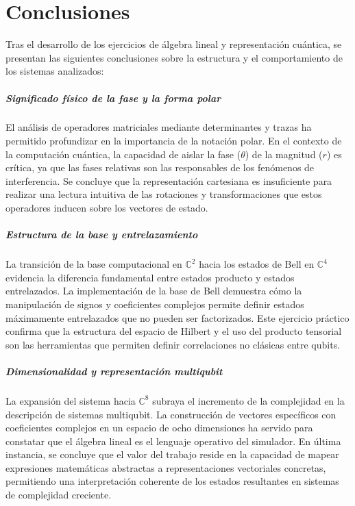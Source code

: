 \documentclass[11pt,a4paper,spanish]{book}
\begin{document}
\chapter{Conclusiones}

Tras el desarrollo de los ejercicios de álgebra lineal y representación cuántica, se presentan las siguientes conclusiones sobre la estructura y el comportamiento de los sistemas analizados:

\paragraph{Significado físico de la fase y la forma polar}
El análisis de operadores matriciales mediante determinantes y trazas ha permitido profundizar en la importancia de la notación polar. En el contexto de la computación cuántica, la capacidad de aislar la fase ($\theta$) de la magnitud ($r$) es crítica, ya que las fases relativas son las responsables de los fenómenos de interferencia. Se concluye que la representación cartesiana es insuficiente para realizar una lectura intuitiva de las rotaciones y transformaciones que estos operadores inducen sobre los vectores de estado.

\paragraph{Estructura de la base y entrelazamiento}
La transición de la base computacional en $\mathbb{C}^2$ hacia los estados de Bell en $\mathbb{C}^4$ evidencia la diferencia fundamental entre estados producto y estados entrelazados. La implementación de la base de Bell demuestra cómo la manipulación de signos y coeficientes complejos permite definir estados máximamente entrelazados que no pueden ser factorizados. Este ejercicio práctico confirma que la estructura del espacio de Hilbert y el uso del producto tensorial son las herramientas que permiten definir correlaciones no clásicas entre qubits.

\paragraph{Dimensionalidad y representación multiqubit}
La expansión del sistema hacia $\mathbb{C}^8$ subraya el incremento de la complejidad en la descripción de sistemas multiqubit. La construcción de vectores específicos con coeficientes complejos en un espacio de ocho dimensiones ha servido para constatar que el álgebra lineal es el lenguaje operativo del simulador. En última instancia, se concluye que el valor del trabajo reside en la capacidad de mapear expresiones matemáticas abstractas a representaciones vectoriales concretas, permitiendo una interpretación coherente de los estados resultantes en sistemas de complejidad creciente.
\end{document}
